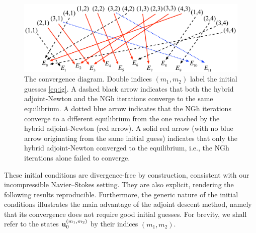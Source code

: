 \documentclass{jfm}
\begin{document}
\begin{figure}
\centering
\includegraphics[width=\textwidth]{conv_diagram_02}
\caption{
The convergence diagram. Double indices $(m_1,m_2)$ label the initial guesses
\eqref{eq:ig}.
A dashed black arrow indicates that both the hybrid adjoint-Newton and the NGh
iterations converge to the same equilibrium.
A dotted blue arrow indicates that the NGh iterations converge to a different
equilibrium from the one reached by the hybrid adjoint-Newton (red
arrow).
A solid red arrow (with no blue arrow originating from the same initial guess)
indicates that only the hybrid adjoint-Newton converged to the equilibrium,
i.e., the NGh iterations alone failed to converge.
}
\label{fig:EQ_diag}
\end{figure}

These initial conditions are divergence-free by construction, consistent with our incompressible
Navier--Stokes setting. They are also explicit, rendering the following results
reproducible. Furthermore, the generic nature of the initial conditions illustrates the main
advantage of the adjoint descent method, namely that its convergence does not require
good initial guesses.
For brevity, we shall refer to the states $\mathbf u_0^{(m_1,m_2)}$ by their
indices $(m_1,m_2)$.
\end{document}
